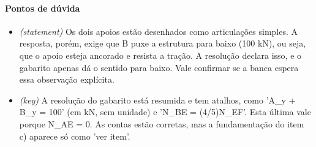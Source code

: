 \documentclass{article}%
\begin{document}
\paragraph{Pontos de dúvida}%
\begin{itemize}%
\item%
\textit{(statement)} Os dois apoios estão desenhados como articulações simples. A resposta, porém, exige que B puxe a estrutura para baixo (100 kN), ou seja, que o apoio esteja ancorado e resista a tração. A resolução declara isso, e o gabarito apenas dá o sentido para baixo. Vale confirmar se a banca espera essa observação explícita.%
\item%
\textit{(key)} A resolução do gabarito está resumida e tem atalhos, como 'A\_y + B\_y = 100' (em kN, sem unidade) e 'N\_BE = (4/5)N\_EF'. Esta última vale porque N\_AE = 0. As contas estão corretas, mas a fundamentação do item c) aparece só como 'ver item'.%
\end{itemize}%
\end{document}
